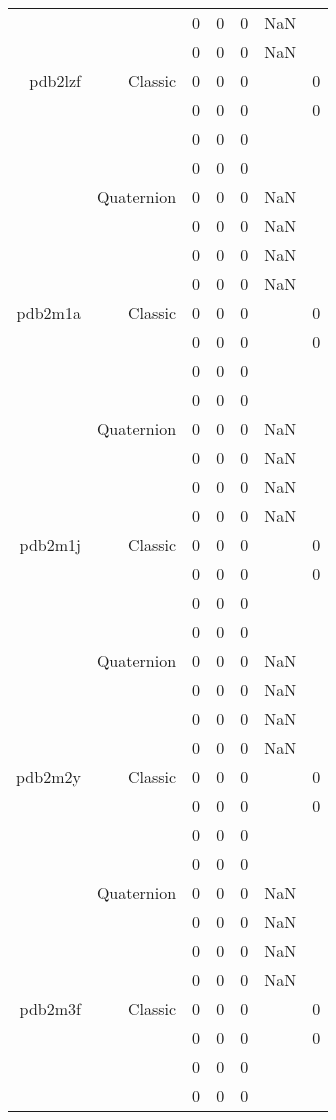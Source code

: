 \begin{xltabular}{\textwidth}{r|rcccSc}
& & 0 & 0 & 0 & NaN & \\
& & 0 & 0 & 0 & NaN & \\ \addlinespace
pdb2lzf & Classic & 0 & 0 & 0 & & 0 \\
& & 0 & 0 & 0 & & 0 \\
& & 0 & 0 & 0 & & \\
& & 0 & 0 & 0 & & \\
& Quaternion & 0 & 0 & 0 & NaN & \\
& & 0 & 0 & 0 & NaN & \\
& & 0 & 0 & 0 & NaN & \\
& & 0 & 0 & 0 & NaN & \\ \addlinespace
pdb2m1a & Classic & 0 & 0 & 0 & & 0 \\
& & 0 & 0 & 0 & & 0 \\
& & 0 & 0 & 0 & & \\
& & 0 & 0 & 0 & & \\
& Quaternion & 0 & 0 & 0 & NaN & \\
& & 0 & 0 & 0 & NaN & \\
& & 0 & 0 & 0 & NaN & \\
& & 0 & 0 & 0 & NaN & \\ \addlinespace
pdb2m1j & Classic & 0 & 0 & 0 & & 0 \\
& & 0 & 0 & 0 & & 0 \\
& & 0 & 0 & 0 & & \\
& & 0 & 0 & 0 & & \\
& Quaternion & 0 & 0 & 0 & NaN & \\
& & 0 & 0 & 0 & NaN & \\
& & 0 & 0 & 0 & NaN & \\
& & 0 & 0 & 0 & NaN & \\ \addlinespace
pdb2m2y & Classic & 0 & 0 & 0 & & 0 \\
& & 0 & 0 & 0 & & 0 \\
& & 0 & 0 & 0 & & \\
& & 0 & 0 & 0 & & \\
& Quaternion & 0 & 0 & 0 & NaN & \\
& & 0 & 0 & 0 & NaN & \\
& & 0 & 0 & 0 & NaN & \\
& & 0 & 0 & 0 & NaN & \\ \addlinespace
pdb2m3f & Classic & 0 & 0 & 0 & & 0 \\
& & 0 & 0 & 0 & & 0 \\
& & 0 & 0 & 0 & & \\
& & 0 & 0 & 0 & & \\

\end{xltabular}
